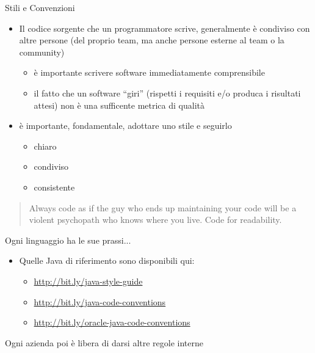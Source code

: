 \documentclass[presentation]{beamer}
\begin{document}
\begin{frame}[allowframebreaks]{Stili e Convenzioni}
	\begin{itemize}\itemsep10pt
		\item Il codice sorgente che un programmatore scrive, generalmente è condiviso con altre persone (del proprio team, ma anche persone esterne al team o la community)
		\begin{itemize}
			\item è importante scrivere software immediatamente comprensibile
			\item il fatto che un software ``giri'' (rispetti i requisiti e/o produca i risultati attesi) non è una sufficente metrica di qualità
		\end{itemize}
		\item è importante, fondamentale, adottare uno stile e seguirlo
		\begin{itemize}
			\item chiaro
			\item condiviso
			\item consistente
		\end{itemize}
	\end{itemize}

\begin{block}{}
\begin{quote}
Always code as if the guy who ends up maintaining your code will be a violent psychopath who knows where you live. Code for readability.
\end{quote}
\end{block}


\begin{block}{Ogni linguaggio ha le sue prassi...}
\begin{itemize}
		\item Quelle Java di riferimento sono disponibili qui:
		\tiny
		\begin{itemize}
			\item \url{http://bit.ly/java-style-guide}
			\item \url{http://bit.ly/java-code-conventions}
			\item \url{http://bit.ly/oracle-java-code-conventions}
		\end{itemize}
	\end{itemize}
\end{block}

\begin{block}{Ogni azienda poi è libera di darsi altre regole interne}


\end{block}
\end{frame}
\end{document}
